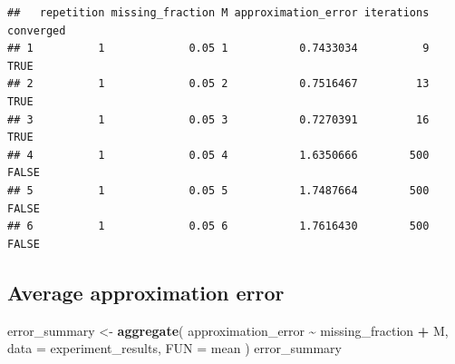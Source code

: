 \documentclass[
  11pt,
]{article}
\newenvironment{Shaded}{\begin{snugshade}}{\end{snugshade}}
\newcommand{\AttributeTok}[1]{\textcolor[rgb]{0.13,0.29,0.53}{#1}}
\newcommand{\DataTypeTok}[1]{\textcolor[rgb]{0.13,0.29,0.53}{#1}}
\newcommand{\DecValTok}[1]{\textcolor[rgb]{0.00,0.00,0.81}{#1}}
\newcommand{\FunctionTok}[1]{\textcolor[rgb]{0.13,0.29,0.53}{\textbf{#1}}}
\newcommand{\NormalTok}[1]{#1}
\newcommand{\OtherTok}[1]{\textcolor[rgb]{0.56,0.35,0.01}{#1}}
\newcommand{\SpecialCharTok}[1]{\textcolor[rgb]{0.81,0.36,0.00}{\textbf{#1}}}
\begin{document}
\begin{Shaded}
\end{Shaded}

\begin{verbatim}
##   repetition missing_fraction M approximation_error iterations converged
## 1          1             0.05 1           0.7433034          9      TRUE
## 2          1             0.05 2           0.7516467         13      TRUE
## 3          1             0.05 3           0.7270391         16      TRUE
## 4          1             0.05 4           1.6350666        500     FALSE
## 5          1             0.05 5           1.7487664        500     FALSE
## 6          1             0.05 6           1.7616430        500     FALSE
\end{verbatim}

\subsection{Average approximation
error}\label{average-approximation-error}

\begin{Shaded}
\begin{Highlighting}[]
\NormalTok{error\_summary }\OtherTok{\textless{}{-}} \FunctionTok{aggregate}\NormalTok{(}
\NormalTok{  approximation\_error }\SpecialCharTok{\textasciitilde{}}\NormalTok{ missing\_fraction }\SpecialCharTok{+}\NormalTok{ M,}
  \AttributeTok{data =}\NormalTok{ experiment\_results,}
  \AttributeTok{FUN =}\NormalTok{ mean}
\NormalTok{)}
\NormalTok{error\_summary}
\end{Highlighting}
\end{Shaded}
\end{document}
